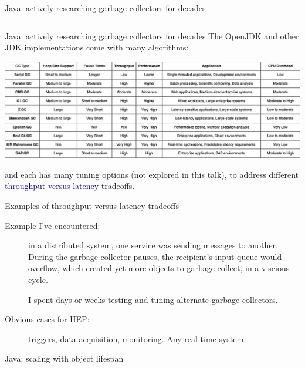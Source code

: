 \documentclass[aspectratio=169]{beamer}
\begin{document}
\begin{frame}{Java: actively researching garbage collectors for decades}
\vspace{0.25 cm}
\begin{columns}
\end{columns}
\end{frame}

\begin{frame}{Java: actively researching garbage collectors for decades}
\vspace{0.25 cm}
The OpenJDK and other JDK implementations come with many algorithms:

\vspace{0.25 cm}
\includegraphics[width=\linewidth]{garbage-collector-comparison.png}

\vspace{0.25 cm} and each has many tuning options (not explored in this talk), to address different \textcolor{darkblue}{throughput-versus-latency} tradeoffs.
\end{frame}

\begin{frame}{Examples of throughput-versus-latency tradeoffs}
\begin{description}
\item[Example I've encountered:] in a distributed system, one service was sending messages to another. During the garbage collector pauses, the recipient's input queue would overflow, which created yet more objects to garbage-collect, in a viscious cycle.

\vspace{0.25 cm}
I spent days or weeks testing and tuning alternate garbage collectors.

\vspace{1 cm}
\item[Obvious cases for HEP:] triggers, data acquisition, monitoring. Any real-time system.
\end{description}
\end{frame}

\begin{frame}{Java: scaling with object lifespan}
\vspace{0.25 cm}
\begin{columns}
\only<2>{\includegraphics[width=\l
\end{columns}
\end{frame}
\end{document}
